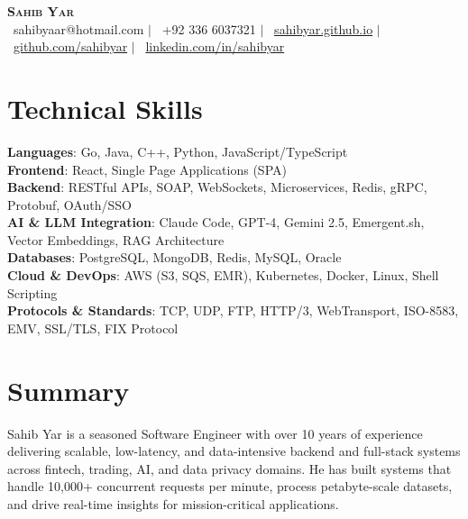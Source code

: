 \documentclass[letterpaper,11pt]{article}
\begin{document}
\begin{center}
    \textbf{\Huge \scshape Sahib Yar} \\ \vspace{1pt}
    \small \faEnvelope\ sahibyaar@hotmail.com $|$ 
    \faPhone\ +92 336 6037321 $|$ 
    \faGlobe\ \href{https://sahibyar.github.io}{sahibyar.github.io} $|$ \\
    \faGithub\ \href{https://github.com/sahibyar}{github.com/sahibyar} $|$
    \faLinkedin\ \href{https://linkedin.com/in/sahibyar}{linkedin.com/in/sahibyar}
\end{center}

\section{Technical Skills}
 \begin{itemize}[leftmargin=0.15in, label={}]
    \small{\item{
     \textbf{Languages}{: Go, Java, C++, Python, JavaScript/TypeScript} \\
     \textbf{Frontend}{: React, Single Page Applications (SPA)} \\
     \textbf{Backend}{: RESTful APIs, SOAP, WebSockets, Microservices, Redis, gRPC, Protobuf, OAuth/SSO} \\
     \textbf{AI \& LLM Integration}{: Claude Code, GPT-4, Gemini 2.5, Emergent.sh, Vector Embeddings, RAG Architecture} \\
     \textbf{Databases}{: PostgreSQL, MongoDB, Redis, MySQL, Oracle} \\
     \textbf{Cloud \& DevOps}{: AWS (S3, SQS, EMR), Kubernetes, Docker, Linux, Shell Scripting} \\
     \textbf{Protocols \& Standards}{: TCP, UDP, FTP, HTTP/3, WebTransport, ISO-8583, EMV, SSL/TLS, FIX Protocol} \\
    }}
 \end{itemize}

\section{Summary}
\small{Sahib Yar is a seasoned Software Engineer with over 10 years of experience delivering scalable, low-latency, and data-intensive backend and full-stack systems across fintech, trading, AI, and data privacy domains. He has built systems that handle 10,000+ concurrent requests per minute, process petabyte-scale datasets, and drive real-time insights for mission-critical applications.}
\end{document}
